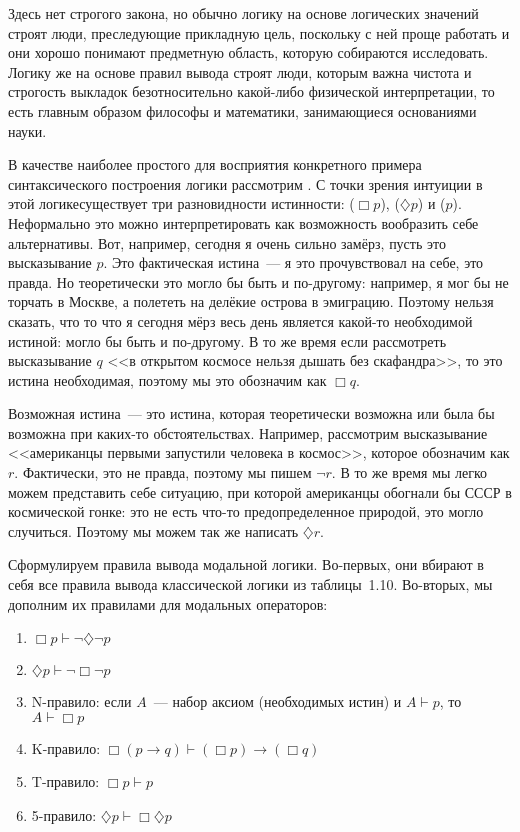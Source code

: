 Здесь нет строгого закона, но обычно логику на основе логических значений строят люди, преследующие прикладную цель, поскольку с ней проще работать и они хорошо понимают предметную область, которую собираются исследовать. Логику же на основе правил вывода строят люди, которым важна чистота и строгость выкладок безотносительно какой-либо физической интерпретации, то есть главным образом философы и математики, занимающиеся основаниями науки.

В качестве наиболее простого для восприятия конкретного примера синтаксического построения логики рассмотрим . С точки зрения интуиции в этой логикесуществует три разновидности истинности:  ($\Box p$),  ($\diamondsuit p$) и  ($p$). Неформально это можно интерпретировать как возможность вообразить себе альтернативы. Вот, например, сегодня я очень сильно замёрз, пусть это высказывание $p$. Это фактическая истина~--- я это прочувствовал на себе, это правда. Но теоретически это могло бы быть и по-другому: например, я мог бы не торчать в Москве, а полететь на делёкие острова в эмиграцию. Поэтому нельзя сказать, что то что я сегодня мёрз весь день является какой-то необходимой истиной: могло бы быть и по-другому. В то же время если рассмотреть высказывание $q$ <<в открытом космосе нельзя дышать без скафандра>>, то это истина необходимая, поэтому мы это обозначим как $\Box q$.

Возможная истина~--- это истина, которая теоретически возможна или была бы возможна при каких-то обстоятельствах. Например, рассмотрим высказывание <<американцы первыми запустили человека в космос>>, которое обозначим как $r$. Фактически, это не правда, поэтому мы пишем $\neg r$. В то же время мы легко можем представить себе ситуацию, при которой американцы обогнали бы СССР в космической гонке: это не есть что-то предопределенное природой, это могло случиться. Поэтому мы можем так же написать $\diamondsuit r$. 

Сформулируем правила вывода модальной логики. Во-первых, они вбирают в себя все правила вывода классической логики из таблицы~1.10. Во-вторых, мы дополним их правилами для модальных операторов:

\begin{enumerate}
\item $\Box p \vdash \neg \diamondsuit \neg p$
\item $\diamondsuit p \vdash \neg \Box \neg p$
\item N-правило: если $A$~--- набор аксиом (необходимых истин) и $A\vdash p$, то $A\vdash \Box p$
\item K-правило: $\Box (p\to q) \vdash (\Box p) \to (\Box q)$
\item T-правило: $\Box p \vdash p$
\item 5-правило: $\diamondsuit p \vdash \Box \diamondsuit p$
\end{enumerate}


